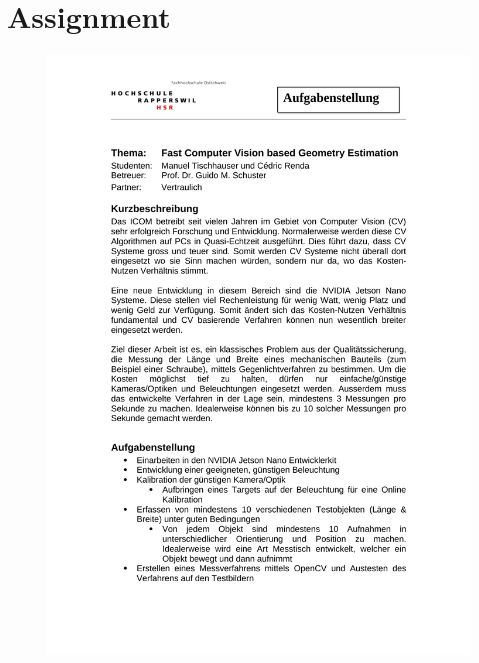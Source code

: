 \chapter{Assignment}

\begin{figure}[H]
	\centering
	\includegraphics[trim= 0cm 0cm 0cm 0cm,page=1,width=13cm]{FastCVbasedGeometryEstimation.pdf}
\end{figure}
